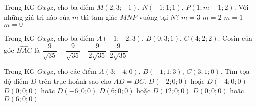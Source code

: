\begin{ex}%
	Trong KG $Oxyz$, cho ba điểm $M(2;3;-1 )$, $N(-1;1;1 )$, $P(1;m-1;2 )$. Với những giá trị nào của $m$ thì tam giác $MNP$ vuông tại $N$?
	\choice 
	{ $m=3$ }
	{ $m=2$ }
	{ $m=1$ }
	{ \True $m=0$ } 
\end{ex}
\begin{ex}%
	Trong KG $Oxyz$, cho ba điểm $A(-1;-2;3)$, $B(0;3;1)$, $C(4;2;2)$. Cosin của góc $\widehat{BAC}$ là
	\choice
	{$\dfrac{9}{\sqrt{35}}$}
	{$-\dfrac{9}{\sqrt{35}}$}
	{$-\dfrac{9}{2\sqrt{35}}$}
	{\True $\dfrac{9}{2\sqrt{35}}$}
\end{ex}
\begin{ex}%
	Trong KG $Oxyz$, cho các điểm $A(3;-4;0)$, $B(-1;1;3)$, $C(3;1;0)$. Tìm tọa độ điểm $D$ trên trục hoành sao cho $AD=BC$.
	\choice 
	{$D(-2;0;0)$ hoặc $D(-4;0;0)$}
	{$D(0;0;0)$ hoặc $D(-6;0;0)$}
	{$D(6;0;0)$ hoặc $D(12;0;0)$}
	{\True $D(0;0;0)$ hoặc $D(6;0;0)$}
\end{ex}
